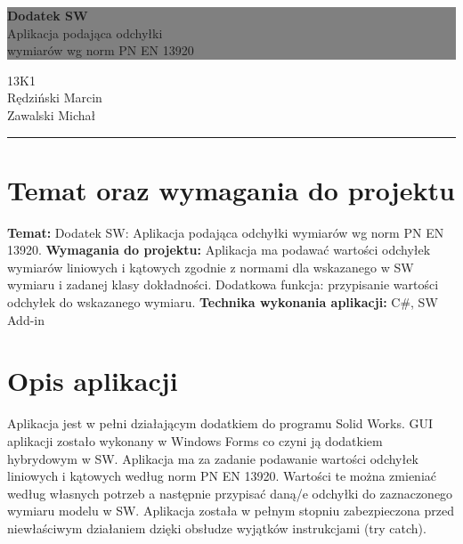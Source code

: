 \documentclass[11pt,a4paper]{article}
\newcommand{\HRule}[1]{\hfill \rule{0.2\linewidth}{#1}}
\begin{document}
\colorbox{grey}{
	\parbox[t]{1.0\linewidth}{
		\centering \fontsize{30pt}{40pt}\selectfont %
		\vspace*{0.7cm} 
		
		\hfill \textbf{Dodatek SW} \\
		\hfill Aplikacja podająca odchyłki \\
		\hfill wymiarów wg norm PN EN 13920 \par
		
		\vspace*{0.7cm} %
	}
}
\vfill
{\centering \large 
\hfill 13K1 \\
\hfill Rędziński Marcin \\
\hfill Zawalski Michał \\
\HRule{1pt}} %

\newpage
\tableofcontents
\newpage
\section{Temat oraz wymagania do projektu}

\textbf{Temat: } Dodatek SW: Aplikacja podająca odchyłki wymiarów wg norm PN EN
13920.
\newline
\newline
\textbf{Wymagania do projektu: } Aplikacja ma podawać wartości odchyłek wymiarów
liniowych i kątowych zgodnie z normami dla wskazanego w SW wymiaru i
zadanej klasy dokładności. Dodatkowa funkcja: przypisanie wartości odchyłek
do wskazanego wymiaru.
\newline
\newline
\textbf{Technika wykonania aplikacji: } C\#, SW Add-in

\section{Opis aplikacji}

Aplikacja jest w pełni działającym dodatkiem do programu Solid Works. GUI aplikacji zostało wykonany w Windows Forms co czyni ją dodatkiem hybrydowym w SW. Aplikacja ma za zadanie podawanie wartości odchyłek liniowych i kątowych według norm PN EN 13920. Wartości te można zmieniać według własnych potrzeb a następnie przypisać daną/e odchyłki do zaznaczonego wymiaru modelu w SW. Aplikacja została w pełnym stopniu zabezpieczona przed niewłaściwym działaniem dzięki obsłudze wyjątków instrukcjami (try catch). 
\end{document}
